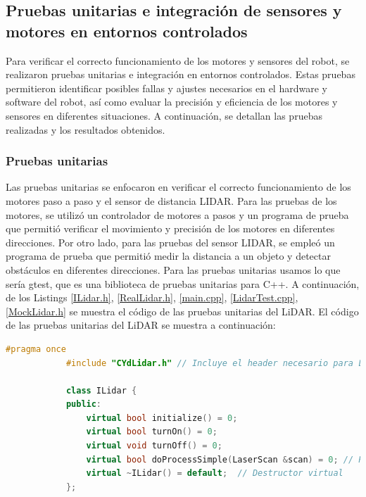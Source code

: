 \subsection{Pruebas unitarias e integraci\'on de sensores y motores en entornos controlados} %
\label{sub:Prub01}

    Para verificar el correcto funcionamiento de los motores y sensores del robot, se realizaron pruebas unitarias e integraci\'on en entornos controlados. 
    Estas pruebas permitieron identificar posibles fallas y ajustes necesarios en el hardware y software del robot, as\'i como evaluar la precisi\'on y 
    eficiencia de los motores y sensores en diferentes situaciones. A continuaci\'on, se detallan las pruebas realizadas y los resultados obtenidos.

    \subsubsection{Pruebas unitarias} %
    \label{ssub:Pruebas unitarias}
        Las pruebas unitarias se enfocaron en verificar el correcto funcionamiento de los motores paso a paso y el sensor de distancia LIDAR. 
        Para las pruebas de los motores, se utiliz\'o un controlador de motores a pasos y un programa de prueba que permiti\'o verificar el 
        movimiento y precisi\'on de los motores en diferentes direcciones. Por otro lado, para las pruebas del sensor LIDAR, se emple\'o un 
        programa de prueba que permiti\'o medir la distancia a un objeto y detectar obst\'aculos en diferentes direcciones. 
        Para las pruebas unitarias usamos lo que ser\'ia gtest, que es una biblioteca de pruebas unitarias para C++.
        A continuaci\'on, de los Listings \ref{ILidar.h}, \ref{RealLidar.h}, \ref{main.cpp}, \ref{LidarTest.cpp}, \ref{MockLidar.h} se muestra el c\'odigo de las pruebas unitarias del LiDAR.
        \vskip 0.5cm
        El c\'odigo de las pruebas unitarias del LiDAR se muestra a continuaci\'on:
        \begin{lstlisting}[language={C++}, caption={ILidar.h}, label={ILidar.h}]
            #pragma once
            #include "CYdLidar.h" // Incluye el header necesario para LaserScan
            
            class ILidar {
            public:
                virtual bool initialize() = 0;
                virtual bool turnOn() = 0;
                virtual void turnOff() = 0;
                virtual bool doProcessSimple(LaserScan &scan) = 0; // Procesa el escaneo de LiDAR
                virtual ~ILidar() = default;  // Destructor virtual
            };            
        \end{lstlisting}
